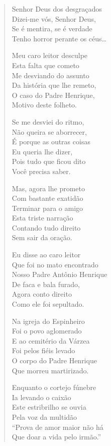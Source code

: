 \begin{verse}
Senhor Deus dos desgraçados\\
Dizei-me vós, Senhor Deus,\\
Se é mentira, se é verdade\\
Tenho horror perante os céus\ldots{}

Meu caro leitor desculpe\\
Esta falta que cometo\\
Me desviando do assunto\\
Da história que lhe remeto,\\
O caso do Padre Henrique,\\
Motivo deste folheto.

Se me desviei do ritmo,\\
Não queira se aborrecer,\\
É porque as outras coisas\\
Eu queria lhe dizer,\\
Pois tudo que ficou dito\\
Você precisa saber.

Mas, agora lhe prometo\\
Com bastante exatidão\\
Terminar para o amigo\\
Esta triste narração\\
Contando tudo direito\\
Sem sair da oração.

Eu disse ao caro leitor\\
Que foi no mato encontrado\\
Nosso Padre Antônio Henrique\\
De faca e bala furado,\\
Agora conto direito\\
Como ele foi sepultado.

Na igreja do Espinheiro\\
Foi o povo aglomerado\\
E ao cemitério da Várzea\\
Foi pelos fiéis levado\\
O corpo do Padre Henrique\\
Que morreu martirizado.

Enquanto o cortejo fúnebre\\
Ia levando o caixão\\
Este estribrilho se ouvia\\
Pela voz da multidão\\
``Prova de amor maior não há\\
Que doar a vida pelo irmão.''


\end{verse}
